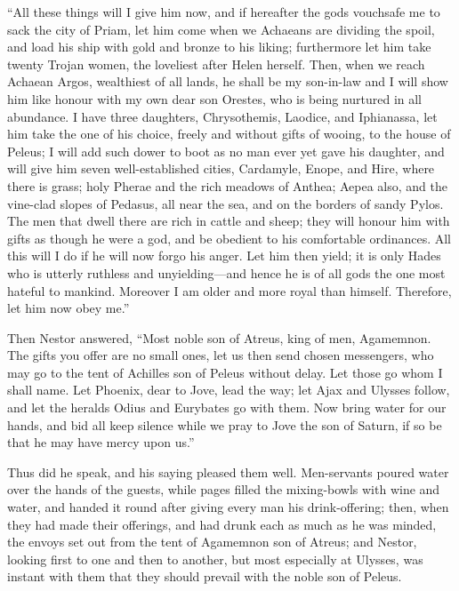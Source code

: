 “All these things will I give him now, and if hereafter the gods vouchsafe
me to sack the city of Priam, let him come when we Achaeans are dividing
the spoil, and load his ship with gold and bronze to his liking;
furthermore let him take twenty Trojan women, the loveliest after Helen
herself. Then, when we reach Achaean Argos, wealthiest of all lands, he
shall be my son-in-law and I will show him like honour with my own dear
son Orestes, who is being nurtured in all abundance. I have three
daughters, Chrysothemis, Laodice, and Iphianassa, let him take the one of
his choice, freely and without gifts of wooing, to the house of Peleus; I
will add such dower to boot as no man ever yet gave his daughter, and will
give him seven well-established cities, Cardamyle, Enope, and Hire, where
there is grass; holy Pherae and the rich meadows of Anthea; Aepea also,
and the vine-clad slopes of Pedasus, all near the sea, and on the borders
of sandy Pylos. The men that dwell there are rich in cattle and sheep;
they will honour him with gifts as though he were a god, and be obedient
to his comfortable ordinances. All this will I do if he will now forgo his
anger. Let him then yield; it is only Hades who is utterly ruthless and
unyielding—and hence he is of all gods the one most hateful to
mankind. Moreover I am older and more royal than himself. Therefore, let
him now obey me.”

Then Nestor answered, “Most noble son of Atreus, king of men, Agamemnon.
The gifts you offer are no small ones, let us then send chosen messengers,
who may go to the tent of Achilles son of Peleus without delay. Let those
go whom I shall name. Let Phoenix, dear to Jove, lead the way; let Ajax
and Ulysses follow, and let the heralds Odius and Eurybates go with them.
Now bring water for our hands, and bid all keep silence while we pray to
Jove the son of Saturn, if so be that he may have mercy upon us.”

Thus did he speak, and his saying pleased them well. Men-servants poured
water over the hands of the guests, while pages filled the mixing-bowls
with wine and water, and handed it round after giving every man his
drink-offering; then, when they had made their offerings, and had drunk
each as much as he was minded, the envoys set out from the tent of
Agamemnon son of Atreus; and Nestor, looking first to one and then to
another, but most especially at Ulysses, was instant with them that they
should prevail with the noble son of Peleus.

